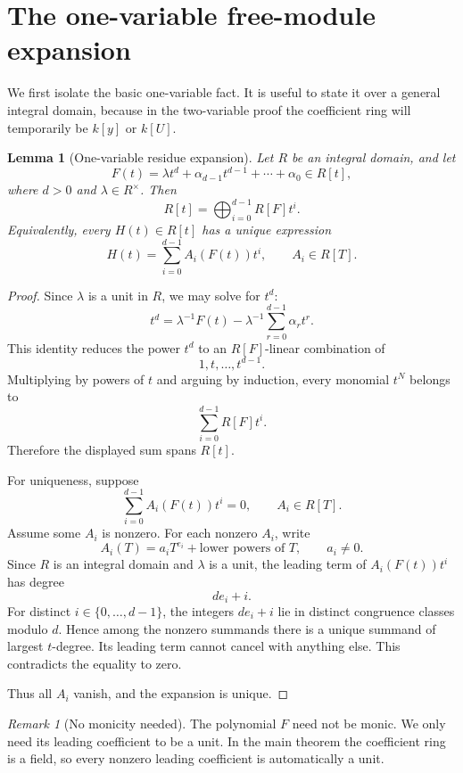 \documentclass[11pt]{article}
\theoremstyle{plain}
\newtheorem{lemma}[theorem]{Lemma}
\theoremstyle{definition}
\theoremstyle{remark}
\newtheorem{remark}[theorem]{Remark}
\begin{document}
\section{The one-variable free-module expansion}

We first isolate the basic one-variable fact. It is useful to state it over a general integral domain, because in the two-variable proof the coefficient ring will temporarily be \(k[y]\) or \(k[U]\).

\begin{lemma}[One-variable residue expansion]\label{lem:one-variable}
Let \(R\) be an integral domain, and let
\[
    F(t)=\lambda t^d+\alpha_{d-1}t^{d-1}+\cdots+\alpha_0\in R[t],
\]
where \(d>0\) and \(\lambda\in R^\times\). Then
\[
    R[t]
    =
    \bigoplus_{i=0}^{d-1} R[F]t^i.
\]
Equivalently, every \(H(t)\in R[t]\) has a unique expression
\[
    H(t)=\sum_{i=0}^{d-1} A_i(F(t))t^i,
    \qquad A_i\in R[T].
\]
\end{lemma}

\begin{proof}
Since \(\lambda\) is a unit in \(R\), we may solve for \(t^d\):
\[
    t^d
    =
    \lambda^{-1}F(t)
    -
    \lambda^{-1}\sum_{r=0}^{d-1}\alpha_r t^r.
\]
This identity reduces the power \(t^d\) to an \(R[F]\)-linear combination of
\[
    1,t,\dots,t^{d-1}.
\]
Multiplying by powers of \(t\) and arguing by induction, every monomial \(t^N\) belongs to
\[
    \sum_{i=0}^{d-1} R[F]t^i.
\]
Therefore the displayed sum spans \(R[t]\).

For uniqueness, suppose
\[
    \sum_{i=0}^{d-1} A_i(F(t))t^i=0,
    \qquad A_i\in R[T].
\]
Assume some \(A_i\) is nonzero. For each nonzero \(A_i\), write
\[
    A_i(T)=a_i T^{e_i}+\text{lower powers of }T,
    \qquad a_i\neq 0.
\]
Since \(R\) is an integral domain and \(\lambda\) is a unit, the leading term of \(A_i(F(t))t^i\) has degree
\[
    d e_i+i.
\]
For distinct \(i\in\{0,\dots,d-1\}\), the integers \(d e_i+i\) lie in distinct congruence classes modulo \(d\). Hence among the nonzero summands there is a unique summand of largest \(t\)-degree. Its leading term cannot cancel with anything else. This contradicts the equality to zero.

Thus all \(A_i\) vanish, and the expansion is unique.
\end{proof}

\begin{remark}[No monicity needed]
The polynomial \(F\) need not be monic. We only need its leading coefficient to be a unit. In the main theorem the coefficient ring is a field, so every nonzero leading coefficient is automatically a unit.
\end{remark}
\end{document}
